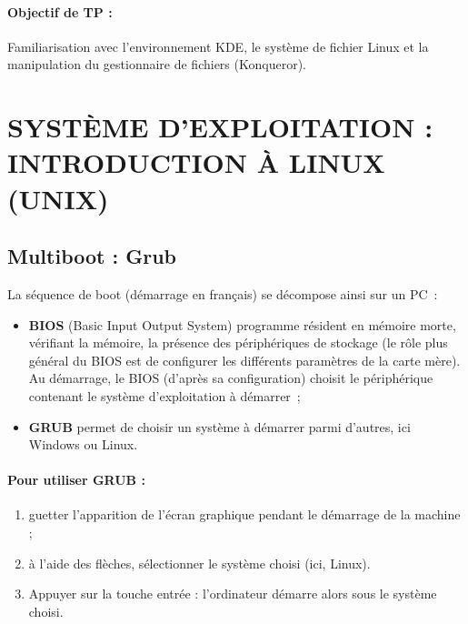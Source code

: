 \documentclass[12pt,a4paper]{article}
\begin{document}


\newcommand{\puis}{\ensuremath{\rightarrow\ }}


\paragraph{Objectif de TP :\\}

Familiarisation avec l'environnement KDE, le système de fichier Linux et la manipulation du
gestionnaire de fichiers (Konqueror).


\section{SYSTÈME D'EXPLOITATION : INTRODUCTION À LINUX (UNIX)}
\subsection{Multiboot : Grub}

   La séquence de boot (démarrage en français) se décompose ainsi sur
   un PC~:

   \begin{itemize}
   \item {\bf BIOS} (Basic Input Output System) programme résident en
     mémoire morte, vérifiant la mémoire, la présence des
     périphériques de stockage (le rôle plus général du BIOS est de
     configurer les différents paramètres de la carte mère). Au
     démarrage, le BIOS (d'après sa configuration) choisit le
     périphérique contenant le système d'exploitation à démarrer~;

   \item {\bf GRUB} permet de choisir un système à démarrer parmi
     d'autres, ici Windows ou Linux.
   \end{itemize}


   \paragraph{Pour utiliser GRUB :\\}
   

   \begin{enumerate}
   \item guetter l'apparition de l'écran graphique pendant le
     démarrage de la machine ;


   \item à l'aide des flèches, sélectionner le système choisi (ici,
     Linux).


   \item Appuyer sur la touche entrée : l'ordinateur démarre alors
     sous le système choisi.
   \end{enumerate}
\end{document}
